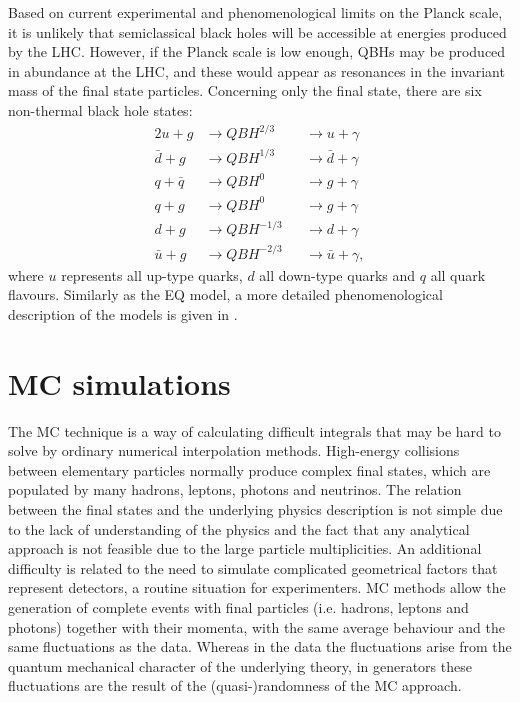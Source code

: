 Based on current experimental and phenomenological limits on the Planck scale, it is unlikely that semiclassical black holes will be accessible at energies produced by the \ac{LHC}. However, if the Planck scale is low enough, \acp{QBH} may be produced in abundance at the \ac{LHC}, and these would appear as resonances in the invariant mass of the final state particles. Concerning only the \gammajet final state, there are six non-thermal black hole states:
\begin{alignat*}{2}
    u + g       & \to QBH^{2/3}     && \to u + \gamma\\
    \bar{d} + g & \to QBH^{1/3}     && \to \bar{d} + \gamma\\
    q + \bar{q} & \to QBH^{0}       && \to g + \gamma\\
    q + g       & \to QBH^{0}       && \to g + \gamma\\
    d + g       & \to QBH^{-1/3}    && \to d + \gamma\\
    \bar{u} + g & \to QBH^{-2/3}    && \to \bar{u} + \gamma,
\end{alignat*}
where \(u\) represents all up-type quarks, \(d\) all down-type quarks and \(q\) all quark flavours. Similarly as the \ac{EQ} model, a more detailed phenomenological description of the models is given in .












\section{\acf{MC} simulations}
\label{sec:theory:mc_simulation}


The \ac{MC} technique is a way of calculating difficult integrals that may be hard to solve by ordinary numerical interpolation methods. High-energy collisions between elementary particles normally produce complex final states, which are populated by many hadrons, leptons, photons and neutrinos. The relation between the final states and the underlying physics description is not simple due to the lack of understanding of the physics and the fact that any analytical approach is not feasible due to the large particle multiplicities. An additional difficulty is related to the need to simulate complicated geometrical factors that represent detectors, a routine situation for experimenters.
\ac{MC} methods allow the generation of complete events with final particles (i.e. hadrons, leptons and photons) together with their momenta, with the same average behaviour and the same fluctuations as the data. Whereas in the data the fluctuations arise from the quantum mechanical character of the underlying theory, in generators these fluctuations are the result of the (quasi-)randomness of the \ac{MC} approach.

